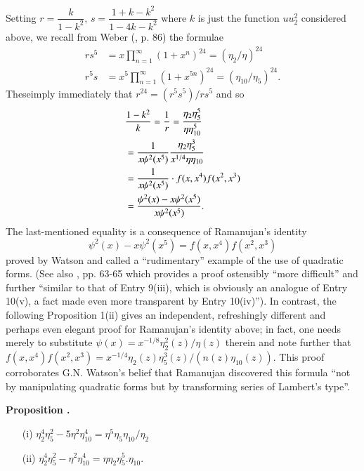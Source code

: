 Setting $r=\dfrac{k}{1-k^{2}}$, $s=\dfrac{1+k-k^{2}}{1-4k-k^{2}}$ where $k$ is just the function $uu^{2}_{2}$ considered above, we recall from Weber (\cite{art8-key14}, p. 86) the formulae 
\begin{align*}
rs^{5} &= x\prod\limits^{\infty}_{n=1}(1+x^{n})^{24}=(\eta_{2}/\eta)^{24}\\
r^{5}s &= x^{5}\prod\limits^{\infty}_{n=1}(1+x^{5n})^{24}=(\eta_{10}/\eta_{5})^{24}.
\end{align*}
These\pageoriginale imply immediately that $r^{24}=(r^{5}s^{5})/rs^{5}$ and so
\begin{align}
& \frac{1-k^{2}}{k} =\frac{1}{r}=\frac{\eta_{2}\eta^{5}_{5}}{\eta\eta^{5}_{10}}\label{art8-eq11}\\
&=\frac{1}{x\psi^{2}(x^{5})}\frac{\eta_{2}\eta^{3}_{5}}{x^{1/4}\eta\eta_{10}}\notag\\
&=\frac{1}{x\psi^{2}(x^{5})}\cdot f(x,x^{4})f(x^{2},x^{3})\notag\\
&=\frac{\psi^{2}(x)-x\psi^{2}(x^{5})}{x\psi^{2}(x^{5})}\label{art8-eq12}.
\end{align}
The last-mentioned equality is a consequence of Ramanujan's identity
$$
\psi^{2}(x)-x\psi^{2}(x^{5})=f(x,x^{4})f(x^{2},x^{3})
$$
proved by Watson \cite{art8-key13} and called a ``rudimentary'' example of the use of quadratic forms. (See also \cite{art8-key1}, pp. 63-65 which provides a proof ostensibly ``more difficult'' and further ``similar to that of Entry 9(iii), which is obviously an analogue of Entry 10(v), a fact made even more transparent by Entry 10(iv)''). In contrast, the following Proposition 1(ii) gives an independent, refreshingly different and perhaps even elegant proof for Ramanujan's identity above; in fact, one needs merely to substitute $\psi(x)=x^{-1/8}\eta^{2}_{2}(z)/\eta(z)$ therein and note further that $f(x,x^{4})f(x^{2},x^{3})=x^{-1/4}\eta_{2}(z)\eta^{3}_{5}(z)/(n(z)\eta_{10}(z))$. This proof corroborates G.N. Watson's belief that Ramanujan discovered this formula ``not by manipulating quad\-ratic forms but by transforming series of Lambert's type''.

\medskip
\noindent
{\bf Proposition .\label{art8-prop1}}
\begin{itemize}
\item[(i)] $\eta^{4}_{2}\eta^{2}_{5}-5\eta^{2}\eta^{4}_{10}=\eta^{5}\eta_{5}\eta_{10}/\eta_{2}$

\item[(ii)] $\eta^{4}_{2}\eta^{2}_{5}-\eta^{2}\eta^{4}_{10}=\eta\eta_{2}\eta^{5}_{5}.\eta_{10}$.
\end{itemize}

